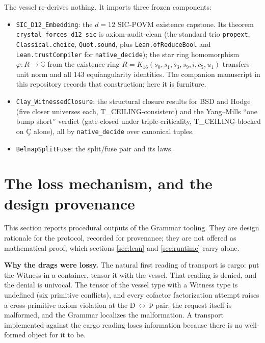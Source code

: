 \documentclass[12pt,a4paper]{article}
\newcommand{\igp}[1]{{\igprimfont #1}}
\begin{document}
The vessel re-derives nothing. It imports three frozen components:
\begin{itemize}
\item \texttt{SIC\_D12\_Embedding}: the $d = 12$ SIC-POVM existence
capstone. Its theorem \texttt{crystal\_forces\_d12\_sic} is
axiom-audit-clean (the standard trio \texttt{propext},
\texttt{Classical.choice}, \texttt{Quot.sound}, plus
\texttt{Lean.ofReduceBool} and \texttt{Lean.trustCompiler} for
\texttt{native\_decide}); the star ring homomorphism
$\varphi : R \to \mathbb{C}$ from the existence ring
$R = K_{16}(s_0,s_1,s_3,s_9,i,c_5,u_1)$ transfers unit norm and all
$143$ equiangularity identities. The companion manuscript in this
repository records that construction; here it is furniture.
\item \texttt{Clay\_WitnessedClosure}: the structural closure results for
BSD and Hodge (five closer universes each, T\_CEILING-consistent) and the
Yang--Mills ``one bump short'' verdict (gate-closed under
triple-criticality, T\_CEILING-blocked on \igp{Ç} alone), all by
\texttt{native\_decide} over canonical tuples.
\item \texttt{BelnapSplitFuse}: the split/fuse pair and its laws.
\end{itemize}

\section{The loss mechanism, and the design provenance}
\label{sec:provenance}

This section reports procedural outputs of the Grammar tooling. They are
design rationale for the protocol, recorded for provenance; they are not
offered as mathematical proof, which sections \ref{sec:lean} and
\ref{sec:runtime} carry alone.

\textbf{Why the drags were lossy.} The natural first reading of transport
is cargo: put the Witness in a container, tensor it with the vessel. That
reading is denied, and the denial is univocal. The tensor of the vessel
type with a Witness type is undefined (six primitive conflicts), and every
cofactor factorization attempt raises a cross-primitive axiom violation at
the \igp{Ð}\,$\leftrightarrow$\,\igp{Þ} pair: the request itself is
malformed, and the Grammar localizes the malformation. A transport
implemented against the cargo reading loses information because there is no
well-formed object for it to be.
\end{document}
